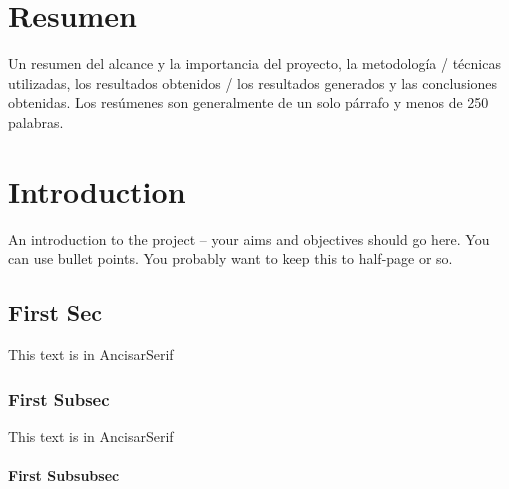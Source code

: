 \documentclass[12pt, letterpaper]{memoir}
\begin{document}
\thispagestyle{empty}



\clearpage
\chapter*{Resumen}

Un resumen del alcance y la importancia del proyecto, la metodología / técnicas utilizadas, los resultados obtenidos / los resultados generados y las conclusiones obtenidas. Los resúmenes son generalmente de un solo párrafo y menos de 250 palabras.

\thispagestyle{empty}

\clearpage
\tableofcontents*
\thispagestyle{empty}


\clearpage
{} 
\singlespacing


\chapter{Introduction}
An introduction to the project -- your aims and objectives should go here. You can use bullet points. You probably want to keep this to half-page or so.

\section{First Sec}

{\UNAncizarSerif This text is in AncisarSerif}

\subsection{First Subsec}

{\UNAncizarSerif This text is in AncisarSerif}


\subsubsection{First Subsubsec}
\end{document}
